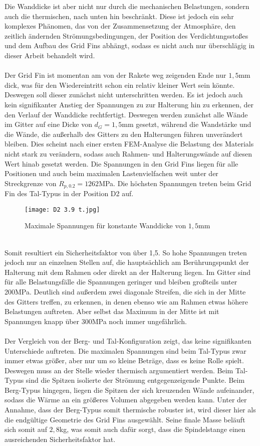 Die Wanddicke ist aber nicht nur durch die mechanischen Belastungen, sondern auch die thermischen, nach unten hin beschränkt. Diese ist jedoch ein sehr komplexes Phänomen, das von der Zusammensetzung der Atmosphäre, den zeitlich ändernden Strömungsbedingungen, der Position des Verdichtungsstoßes und dem Aufbau des Grid Fins abhängt, sodass es nicht auch nur überschlägig in dieser Arbeit behandelt wird.
\\~\\
Der Grid Fin ist momentan am von der Rakete weg zeigenden Ende nur $1,5$mm dick, was für den Wiedereintritt schon ein relativ kleiner Wert sein könnte. Deswegen soll dieser zunächst nicht unterschritten werden. Es ist jedoch auch kein signifikanter Anstieg der Spannungen zu zur Halterung hin zu erkennen, der den Verlauf der Wanddicke rechtfertigt. Deswegen werden zunächst alle Wände im Gitter auf eine Dicke von $d_G = 1,5$mm gesetzt, während die Wandstärke und die Wände, die außerhalb des Gitters zu den Halterungen führen unverändert bleiben. Dies scheint nach einer ersten FEM-Analyse die Belastung des Materials nicht stark zu verändern, sodass auch Rahmen- und Halterungswände auf diesen Wert hinab gesetzt werden. Die Spannungen in den Grid Fins liegen für alle Positionen und auch beim maximalen Lastenvielfachen weit unter der Streckgrenze von $R_{p, 0.2} = 1262$MPa. Die höchsten Spannungen treten beim Grid Fin des Tal-Typus in der Position D2 auf. 
\begin{figure}[h] 
	\centering
	\texttt{[image: D2 3.9 t.jpg]}
	\caption{Maximale Spannungen für konstante Wanddicke von $1,5$mm}
\end{figure}\\
Somit resultiert ein Sicherheitsfaktor von über 1,5. So hohe Spannungen treten jedoch nur an einzelnen Stellen auf, die hauptsächlich am Berührungspunkt der Halterung mit dem Rahmen oder direkt an der Halterung liegen. Im Gitter sind für alle Belastungsfälle die Spannungen geringer und bleiben großteils unter 200MPa. Deutlich sind außerdem zwei diagonale Streifen, die sich in der Mitte des Gitters treffen, zu erkennen, in denen ebenso wie am Rahmen etwas höhere Belastungen auftreten. Aber selbst das Maximum in der Mitte ist mit Spannungen knapp über 300MPa noch immer ungefährlich.
\\~\\
Der Vergleich von der Berg- und Tal-Konfiguration zeigt, das keine signifikanten Unterschiede auftreten. Die maximalen Spannungen sind beim Tal-Typus zwar immer etwas größer, aber nur um so kleine Beträge, dass es keine Rolle spielt. Deswegen muss an der Stelle wieder thermisch argumentiert werden. Beim Tal-Typus sind die Spitzen isolierte der Strömung entgegenzeigende Punkte. Beim Berg-Typus hingegen, liegen die Spitzen der sich kreuzenden Wände aufeinander, sodass die Wärme an ein größeres Volumen abgegeben werden kann. Unter der Annahme, dass der Berg-Typus somit thermische robuster ist, wird dieser hier als die endgültige Geometrie des Grid Fins ausgewählt. Seine finale Masse beläuft sich somit auf $2,8$kg, was somit auch dafür sorgt, dass die Spindelstange einen ausreichenden Sicherheitsfaktor hat.
